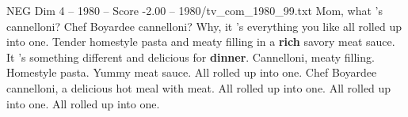 \begin{textsample}{NEG Dim 4 – 1980 – Score -2.00 – 1980/tv\_com\_1980\_99.txt}  \label{ex:f4_neg_032}
Mom, what 's cannelloni?
Chef Boyardee cannelloni?
Why, it 's everything you like all rolled up into one.
Tender homestyle pasta and meaty filling in a \textbf{rich} savory meat sauce.
It 's something different and delicious for \textbf{dinner}.
Cannelloni, meaty filling.
Homestyle pasta.
Yummy meat sauce.
All rolled up into one.
Chef Boyardee cannelloni, a delicious hot meal with meat.
All rolled up into one.
All rolled up into one.
All rolled up into one.

\end{textsample}
